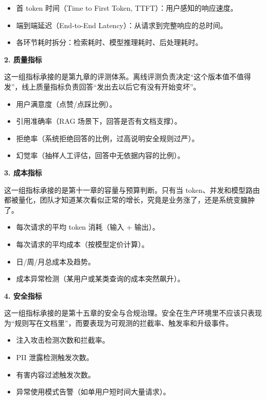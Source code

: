 \begin{itemize}
  \item 首 token 时间（Time to First Token, TTFT）：用户感知的响应速度。
  \item 端到端延迟（End-to-End Latency）：从请求到完整响应的总时间。
  \item 各环节耗时拆分：检索耗时、模型推理耗时、后处理耗时。
\end{itemize}

\textbf{2. 质量指标}

这一组指标承接的是第九章的评测体系。离线评测负责决定“这个版本值不值得发”，线上质量指标负责回答“发出去以后它有没有开始变坏”。

\begin{itemize}
  \item 用户满意度（点赞/点踩比例）。
  \item 引用准确率（RAG 场景下，回答是否有文档支撑）。
  \item 拒绝率（系统拒绝回答的比例，过高说明安全规则过严）。
  \item 幻觉率（抽样人工评估，回答中无依据内容的比例）。
\end{itemize}

\textbf{3. 成本指标}

这一组指标承接的是第十一章的容量与预算判断。只有当 token、并发和模型路由都被量化，团队才知道某次看似正常的增长，究竟是业务涨了，还是系统变臃肿了。

\begin{itemize}
  \item 每次请求的平均 token 消耗（输入 + 输出）。
  \item 每次请求的平均成本（按模型定价计算）。
  \item 日/周/月总成本及趋势。
  \item 成本异常检测（某用户或某类查询的成本突然飙升）。
\end{itemize}

\textbf{4. 安全指标}

这一组指标承接的是第十五章的安全与合规治理。安全在生产环境里不应该只表现为“规则写在文档里”，而要表现为可观测的拦截率、触发率和升级事件。

\begin{itemize}
  \item 注入攻击检测次数和拦截率。
  \item PII 泄露检测触发次数。
  \item 有害内容过滤触发次数。
  \item 异常使用模式告警（如单用户短时间大量请求）。
\end{itemize}


